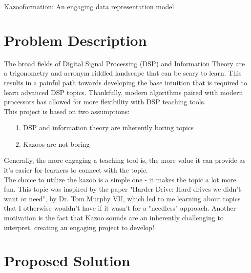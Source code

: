 \documentclass[]{article}
\begin{document}
\begin{center}
  \begin{Large}
  Kazooformation: An engaging data representation model
  \end{Large}
\end{center}

\section{Problem Description}

The broad fields of Digital Signal Processing (DSP) and Information Theory are a trigonometry and acronym riddled landscape that can be scary to learn.
This results in a painful path towards developing the base intuition that is required to learn advanced DSP topics.
Thankfully, modern algorithms paired with modern processors has allowed for more flexibility with DSP teaching tools. \\

This project is based on two assumptions:

\begin{itemize}
  \item[1.] DSP and information theory are inherently boring topics
  \item[2.] Kazoos are not boring
\end{itemize}

Generally, the more engaging a teaching tool is, the more value it can provide as it's easier for learners to connect with the topic. \\

The choice to utilize the kazoo is a simple one - it makes the topic a lot more fun. This topic was inspired by the paper "Harder Drive: Hard drives we didn't want or need", by Dr. Tom Murphy VII, which led to me learning about topics that I otherwise wouldn't have if it wasn't for a "needless" approach. Another motivation is the fact that Kazoo sounds are an inherently challenging to interpret, creating an engaging project to develop!

\section{Proposed Solution}
\end{document}
